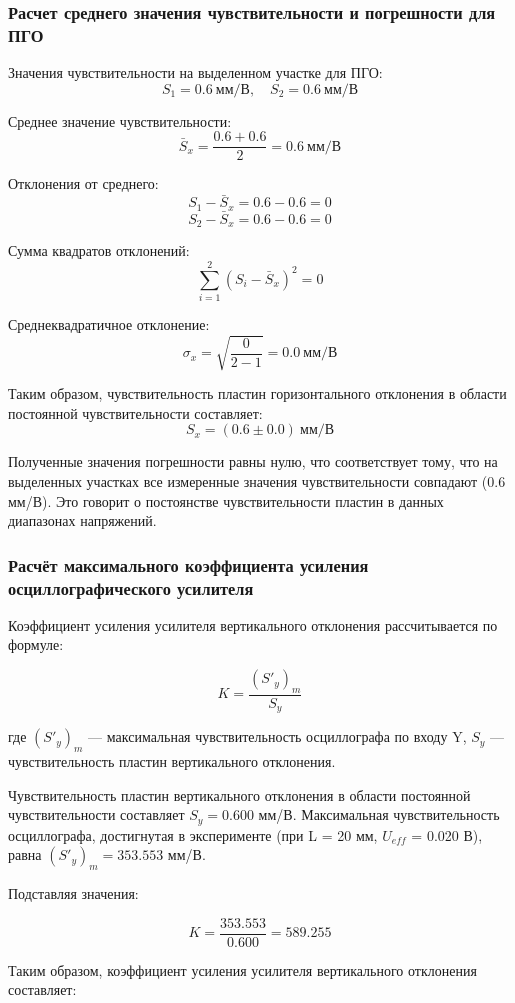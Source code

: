\documentclass[a4paper,14pt]{extarticle}
\theoremstyle{plain}
\theoremstyle{remark}
\theoremstyle{definition}
\begin{document}
\subsubsection{Расчет среднего значения чувствительности и погрешности для ПГО}

Значения чувствительности на выделенном участке для ПГО:
\[
S_{1} = 0.6 \ \text{мм/В}, \quad S_{2} = 0.6 \ \text{мм/В}
\]

Среднее значение чувствительности:
\[
\bar{S}_x = \frac{0.6 + 0.6}{2} = 0.6 \ \text{мм/В}
\]

Отклонения от среднего:
\[
S_{1} - \bar{S}_x = 0.6 - 0.6 = 0
\]
\[
S_{2} - \bar{S}_x = 0.6 - 0.6 = 0
\]

Сумма квадратов отклонений:
\[
\sum_{i=1}^{2} (S_{i} - \bar{S}_x)^2 = 0
\]

Среднеквадратичное отклонение:
\[
\sigma_x = \sqrt{\frac{0}{2-1}} = 0.0 \ \text{мм/В}
\]

Таким образом, чувствительность пластин горизонтального отклонения в области постоянной чувствительности составляет:
\[
S_x = (0.6 \pm 0.0) \ \text{мм/В}
\]

Полученные значения погрешности равны нулю, что соответствует тому, что на выделенных участках все измеренные значения чувствительности совпадают (0.6 мм/В). Это говорит о постоянстве чувствительности пластин в данных диапазонах напряжений. 

\subsubsection{Расчёт максимального коэффициента усиления осциллографического усилителя}
Коэффициент усиления усилителя вертикального отклонения рассчитывается по формуле:

\[
K = \frac{(S'_y)_m}{S_y}
\]

где \((S'_y)_m\) — максимальная чувствительность осциллографа по входу Y, \(S_y\) — чувствительность пластин вертикального отклонения.

Чувствительность пластин вертикального отклонения в области постоянной чувствительности составляет \(S_y = 0.600\) мм/В. Максимальная чувствительность осциллографа, достигнутая в эксперименте (при L = 20 мм, \(U_{eff}\) = 0.020 В), равна \((S'_y)_m = 353.553\) мм/В.

Подставляя значения:

\[
K = \frac{353.553}{0.600} = 589.255
\] 

Таким образом, коэффициент усиления усилителя вертикального отклонения составляет:
\end{document}
